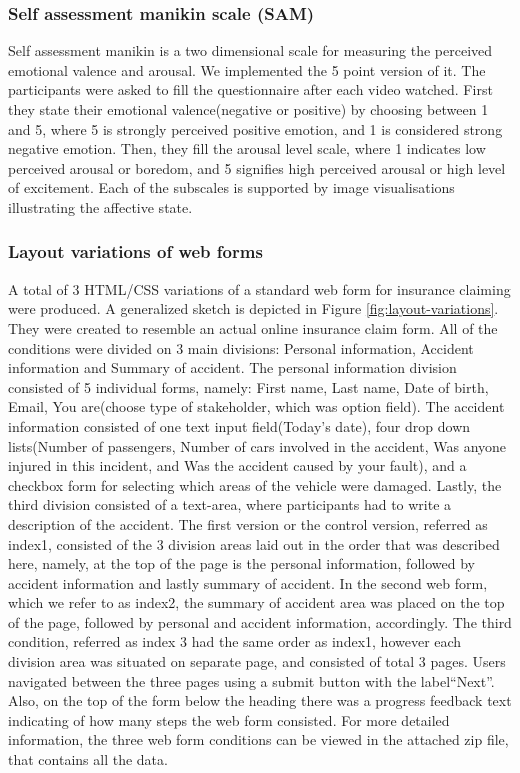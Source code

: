 \documentclass[../main/Feedback.tex]{subfiles}
\begin{document}
\subsubsection{Self assessment manikin scale (SAM)}
Self assessment manikin\cite{bradley1994measuring} is a two dimensional scale for measuring the perceived emotional valence and arousal. We implemented the 5 point version of it. The participants were asked to fill the questionnaire after each video watched. First they state their emotional valence(negative or positive) by choosing between 1 and 5, where 5 is strongly perceived positive emotion, and 1 is considered strong negative emotion. Then, they fill the arousal level scale, where 1 indicates low perceived arousal or boredom, and 5 signifies high perceived arousal or high level of excitement. Each of the subscales is supported by image visualisations illustrating the affective state.
\subsubsection{Layout variations of web forms}

A total of 3 HTML/CSS variations of a standard web form for insurance claiming were produced. A generalized sketch is depicted in Figure \ref{fig:layout-variations}. They were created to resemble an actual online insurance claim form. All of the conditions were divided on 3 main divisions: Personal information, Accident information and Summary of accident. The personal information division consisted of 5 individual forms, namely: First name, Last name, Date of birth, Email, You are(choose type of stakeholder, which was option field). The accident information consisted of one text input field(Today's date), four drop down lists(Number of passengers, Number of cars involved in the accident, Was anyone injured in this incident, and Was the accident caused by your fault), and a checkbox form for selecting which areas of the vehicle were damaged. Lastly, the third division consisted of a text-area, where participants had to write a description of the accident. The first version or the control version, referred as index1, consisted of the 3 division areas laid out in the order that was described here, namely, at the top of the page is the personal information, followed by accident information and lastly summary of accident. In the second web form, which we refer to as index2, the summary of accident area was placed on the top of the page, followed by personal and accident information, accordingly. The third condition, referred as index 3 had the same order as index1, however each division area was situated on separate page, and consisted of total 3 pages. Users navigated between the three pages using a submit button with the label``Next''. Also, on the top of the form below the heading there was a progress feedback text indicating of how many steps the web form consisted. For more detailed information, the three web form conditions can be viewed in the attached zip file, that contains all the data.
\end{document}

